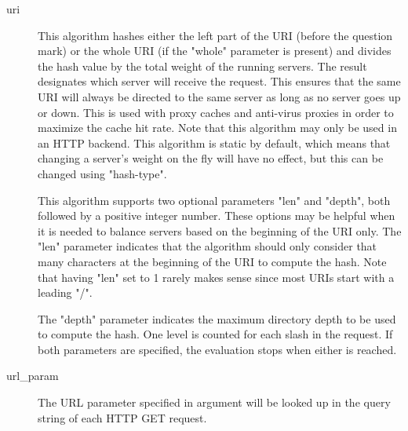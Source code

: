\begin{description}
      \item[uri]         This algorithm hashes either the left part of the URI (before
                  the question mark) or the whole URI (if the "whole" parameter
                  is present) and divides the hash value by the total weight of
                  the running servers. The result designates which server will
                  receive the request. This ensures that the same URI will
                  always be directed to the same server as long as no server
                  goes up or down. This is used with proxy caches and
                  anti-virus proxies in order to maximize the cache hit rate.
                  Note that this algorithm may only be used in an HTTP backend.
                  This algorithm is static by default, which means that
                  changing a server's weight on the fly will have no effect,
                  but this can be changed using "hash-type".

                  This algorithm supports two optional parameters "len" and
                  "depth", both followed by a positive integer number. These
                  options may be helpful when it is needed to balance servers
                  based on the beginning of the URI only. The "len" parameter
                  indicates that the algorithm should only consider that many
                  characters at the beginning of the URI to compute the hash.
                  Note that having "len" set to 1 rarely makes sense since most
                  URIs start with a leading "/".

                  The "depth" parameter indicates the maximum directory depth
                  to be used to compute the hash. One level is counted for each
                  slash in the request. If both parameters are specified, the
                  evaluation stops when either is reached.

      \item[url\_param]   The URL parameter specified in argument will be looked up in
                  the query string of each HTTP GET request.


\end{description}
